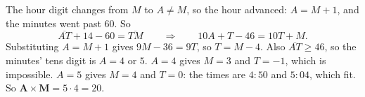 The hour digit changes from $M$ to $A\ne M$, so the hour advanced: $A=M+1$, and the minutes went past $60$. So
\[\overline{AT}+14-60=\overline{TM}\qquad\Longrightarrow\qquad10A+T-46=10T+M.\]
Substituting $A=M+1$ gives $9M-36=9T$, so $T=M-4$. Also $\overline{AT}\ge46$, so the minutes' tens digit is $A=4$ or $5$. $A=4$ gives $M=3$ and $T=-1$, which is impossible. $A=5$ gives $M=4$ and $T=0$: the times are $4{:}50$ and $5{:}04$, which fit. So $\textbf{A}\times\textbf{M}=5\cdot4=\boxed{20}$.
